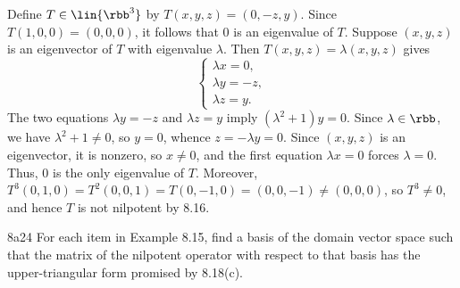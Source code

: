 \begin{sol}
    Define $T \in \lin{\rbb^3}$ by $T(x, y, z) = (0, -z, y)$.
    Since $T(1, 0, 0) = (0, 0, 0)$, it follows that $0$ is an eigenvalue of $T$.
    Suppose $(x, y, z)$ is an eigenvector of $T$ with eigenvalue $\lambda$.
    Then $T(x, y, z) = \lambda(x, y, z)$ gives
    \[
        \begin{cases}
            \lambda x = 0, \\
            \lambda y = -z, \\
            \lambda z = y.
        \end{cases}
    \]
    The two equations $\lambda y = -z$ and $\lambda z = y$ imply $(\lambda^2 + 1)y = 0$.
    Since $\lambda \in \rbb$, we have $\lambda^2 + 1 \neq 0$, so $y = 0$, whence $z = -\lambda y = 0$.
    Since $(x, y, z)$ is an eigenvector, it is nonzero, so $x \neq 0$, and the first equation $\lambda x = 0$ forces $\lambda = 0$.
    Thus, $0$ is the only eigenvalue of $T$.
    Moreover, $T^3(0, 1, 0) = T^2(0, 0, 1) = T(0, -1, 0) = (0, 0, -1) \neq (0, 0, 0)$, so $T^3 \neq 0$, and hence $T$ is not nilpotent by 8.16.
\end{sol}

\begin{exercise}{8a24}
    For each item in Example 8.15, find a basis of the domain vector space such that the matrix of the nilpotent operator with respect to that basis has the upper-triangular form promised by 8.18(c).
\end{exercise}

